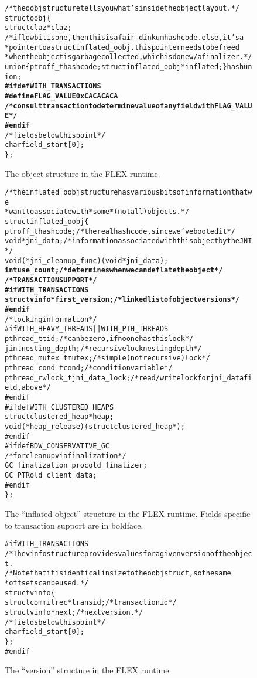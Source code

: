 \documentclass[11pt,notitlepage]{article}
\begin{document}
\begin{figure}
\begin{alltt}\small
/* the oobj structure tells you what's inside the object layout. */
struct oobj \{
  struct claz *claz;
  /* if low bit is one, then this is a fair-dinkum hashcode. else, it's a
   * pointer to a struct inflated_oobj. this pointer needs to be freed
   * when the object is garbage collected, which is done w/ a finalizer. */
  union \{ ptroff_t hashcode; struct inflated_oobj *inflated; \} hashunion;
\textbf{#ifdef WITH_TRANSACTIONS
#define FLAG_VALUE 0xCACACACA
  /* consult transaction to determine value of any field with FLAG_VALUE */
#endif}
  /* fields below this point */
  char field_start[0];
\};
\end{alltt}
\caption{The object structure in the FLEX runtime.}
\label{fig:oobj}
\end{figure}
\begin{figure}
\begin{alltt}\small
/* the inflated_oobj structure has various bits of information that we
 * want to associate with *some* (not all) objects. */
struct inflated_oobj \{
  ptroff_t hashcode; /* the real hashcode, since we've booted it */
  void *jni_data; /* information associated with this object by the JNI */
  void (*jni_cleanup_func)(void *jni_data);
\textbf{  int use_count; /* determines when we can deflate the object */
  /* TRANSACTION SUPPORT */
#if WITH_TRANSACTIONS
  struct vinfo *first_version; /* linked list of object versions */
#endif}
  /* locking information */
#if WITH_HEAVY_THREADS || WITH_PTH_THREADS
  pthread_t tid; /* can be zero, if no one has this lock */
  jint nesting_depth; /* recursive lock nesting depth */
  pthread_mutex_t mutex; /* simple (not recursive) lock */
  pthread_cond_t  cond; /* condition variable */
  pthread_rwlock_t jni_data_lock; /*read/write lock for jni_data field, above*/
#endif
#ifdef WITH_CLUSTERED_HEAPS
  struct clustered_heap * heap;
  void (*heap_release)(struct clustered_heap *);
#endif
#ifdef BDW_CONSERVATIVE_GC
  /* for cleanup via finalization */
  GC_finalization_proc old_finalizer;
  GC_PTR old_client_data;
#endif
\};
\end{alltt}
\caption{The ``inflated object'' structure in the FLEX runtime.
         Fields specific to transaction support are in boldface.}
\label{fig:infl}
\end{figure}

\begin{figure}
\begin{alltt}\small
#if WITH_TRANSACTIONS
/* The vinfo structure provides values for a given version of the object.
/* Note that it is identical in size to the oobj struct, so the same 
 * offsets can be used. */
struct vinfo \{
  struct commitrec *transid; /* transaction id */ 
  struct vinfo *next; /* next version. */
  /* fields below this point */
  char field_start[0];
\};
#endif
\end{alltt}
\caption{The ``version'' structure in the FLEX runtime.}
\label{fig:version}
\end{figure}
\end{document}
